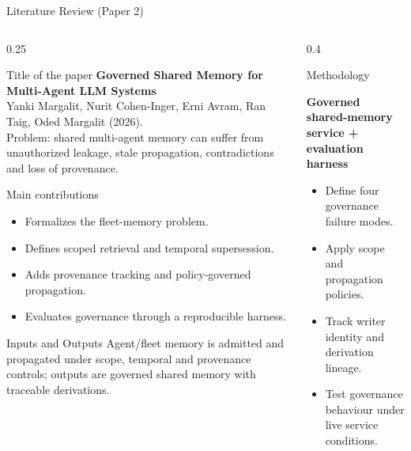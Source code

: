\begin{frame}{Literature Review (Paper 2)}
\begin{columns}[T]
  \begin{column}{0.25\textwidth}
    \begin{block}{Title of the paper \cite{margalit26}}
      \tiny \textbf{Governed Shared Memory for Multi-Agent LLM Systems}\\[2pt] Yanki Margalit, Nurit Cohen-Inger, Erni Avram, Ran Taig, Oded Margalit (2026).\\[2pt] Problem: shared multi-agent memory can suffer from unauthorized leakage, stale propagation, contradictions and loss of provenance.
    \end{block}
    \vspace{0.12cm}
    \begin{block}{Main contributions}
      \tiny
      \begin{itemize}\setlength\itemsep{1pt}
      \item Formalizes the fleet-memory problem.
\item Defines scoped retrieval and temporal supersession.
\item Adds provenance tracking and policy-governed propagation.
\item Evaluates governance through a reproducible harness.
      \end{itemize}
    \end{block}
    \vspace{0.12cm}
    \begin{block}{Inputs and Outputs}
      \tiny Agent/fleet memory is admitted and propagated under scope, temporal and provenance controls; outputs are governed shared memory with traceable derivations.
    \end{block}
  \end{column}

  \begin{column}{0.4\textwidth}
    \begin{block}{Methodology}
    \tiny
    \begin{center}
    \textbf{Governed shared-memory service + evaluation harness}
    \end{center}
    \begin{itemize}\setlength\itemsep{1pt}
    \item Define four governance failure modes.
\item Apply scope and propagation policies.
\item Track writer identity and derivation lineage.
\item Test governance behaviour under live service conditions.
    \end{itemize}
    \end{block}


\end{column}
\end{columns}
\end{frame}
